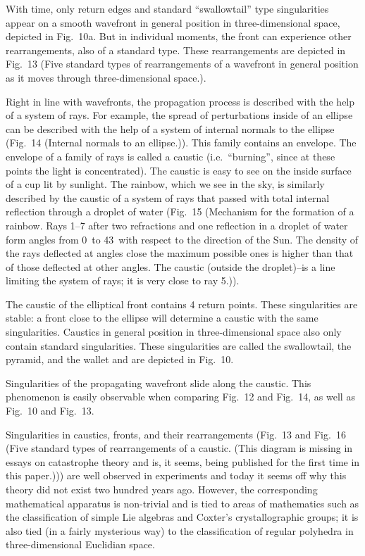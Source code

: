 \documentclass[12pt]{amsart}
\begin{document}
With time, only return edges and standard ``swallowtail'' type singularities
appear on a smooth wavefront in general position in three-dimensional space,
depicted in Fig.~10a.
But in individual moments, the front can experience other rearrangements, also
of a standard type.
These rearrangements are depicted in Fig.~13 (Five standard types of
rearrangements of a wavefront in general position as it moves through
three-dimensional space.).

Right in line with wavefronts, the propagation process is described with the
help of a system of rays.
For example, the spread of perturbations inside of an ellipse can be described
with the help of a system of internal normals to the ellipse (Fig.~14 (Internal
normals to an ellipse.)).
This family contains an envelope.
The envelope of a family of rays is called a caustic (i.e.~``burning'', since
at these points the light is concentrated).
The caustic is easy to see on the inside surface of a cup lit by sunlight.
The rainbow, which we see in the sky, is similarly described by the caustic of a
system of rays that passed with total internal reflection through a droplet of
water (Fig.~15 (Mechanism for the formation of a rainbow.
Rays 1--7 after two refractions and one reflection in a droplet of water form
angles from 0\degree~to 43\degree~with respect to the direction of the Sun.
The density of the rays deflected at angles close the maximum possible ones is
higher than that of those deflected at other angles.
The caustic (outside the droplet)--is a line limiting the system of rays; it is
very close to ray 5.)).

The caustic of the elliptical front contains 4 return points.
These singularities are stable: a front close to the ellipse will determine a
caustic with the same singularities.
Caustics in general position in three-dimensional space also only contain
standard singularities.
These singularities are called the swallowtail, the pyramid, and the wallet and
are depicted in Fig.~10.

Singularities of the propagating wavefront slide along the caustic.
This phenomenon is easily observable when comparing Fig.~12 and Fig.~14, as well
as Fig.~10 and Fig.~13.

Singularities in caustics, fronts, and their rearrangements (Fig.~13 and Fig.\
16 (Five standard types of rearrangements of a caustic.
(This diagram is missing in essays on catastrophe theory and is, it seems, being
published for the first time in this paper.))) are well observed in experiments
and today it seems off why this theory did not exist two hundred years ago.
However, the corresponding mathematical apparatus is non-trivial and is tied to
areas of mathematics such as the classification of simple Lie algebras and
Coxter's crystallographic groups; it is also tied (in a fairly mysterious way)
to the classification of regular polyhedra in three-dimensional Euclidian
space.\\
\end{document}
